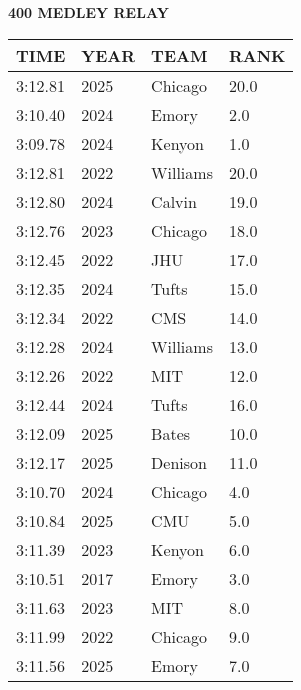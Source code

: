 \begin{center}
\begin{minipage}[t]{0.7\textwidth}
\centering
\textbf{400 MEDLEY RELAY}\\[0.05cm]
\begin{tabular}{@{}p{1.8cm}p{1.2cm}p{1.4cm}p{0.8cm}@{}}
\hline
\textbf{TIME} & \textbf{YEAR} & \textbf{TEAM} & \textbf{RANK} \\
\hline
3:12.81 & 2025 & Chicago & 20.0 \\
3:10.40 & 2024 & Emory & 2.0 \\
3:09.78 & 2024 & Kenyon & 1.0 \\
3:12.81 & 2022 & Williams & 20.0 \\
3:12.80 & 2024 & Calvin & 19.0 \\
3:12.76 & 2023 & Chicago & 18.0 \\
3:12.45 & 2022 & JHU & 17.0 \\
3:12.35 & 2024 & Tufts & 15.0 \\
3:12.34 & 2022 & CMS & 14.0 \\
3:12.28 & 2024 & Williams & 13.0 \\
3:12.26 & 2022 & MIT & 12.0 \\
3:12.44 & 2024 & Tufts & 16.0 \\
3:12.09 & 2025 & Bates & 10.0 \\
3:12.17 & 2025 & Denison & 11.0 \\
3:10.70 & 2024 & Chicago & 4.0 \\
3:10.84 & 2025 & CMU & 5.0 \\
3:11.39 & 2023 & Kenyon & 6.0 \\
3:10.51 & 2017 & Emory & 3.0 \\
3:11.63 & 2023 & MIT & 8.0 \\
3:11.99 & 2022 & Chicago & 9.0 \\
3:11.56 & 2025 & Emory & 7.0 \\
\hline
\end{tabular}
\end{minipage}
\end{center}

\vspace{0.4cm}

